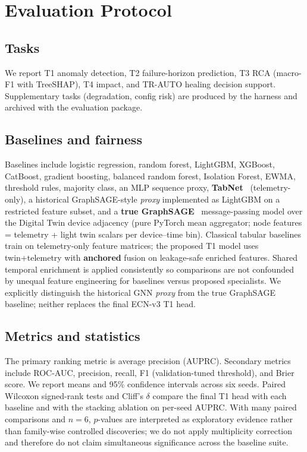 \section{Evaluation Protocol}
\label{sec:eval}

\subsection{Tasks}
We report T1 anomaly detection, T2 failure-horizon prediction, T3 RCA (macro-F1 with TreeSHAP), T4 impact, and TR-AUTO healing decision support. Supplementary tasks (degradation, config risk) are produced by the harness and archived with the evaluation package.

\subsection{Baselines and fairness}
Baselines include logistic regression, random forest, LightGBM, XGBoost, CatBoost, gradient boosting, balanced random forest, Isolation Forest, EWMA, threshold rules, majority class, an MLP sequence proxy, \textbf{TabNet}~\cite{arik2021tabnet} (telemetry-only), a historical GraphSAGE-style \emph{proxy} implemented as LightGBM on a restricted feature subset, and a \textbf{true GraphSAGE}~\cite{hamilton2017inductive} message-passing model over the Digital Twin device adjacency (pure PyTorch mean aggregator; node features = telemetry + light twin scalars per device--time bin). Classical tabular baselines train on telemetry-only feature matrices; the proposed T1 model uses twin+telemetry with \textbf{anchored} fusion on leakage-safe enriched features. Shared temporal enrichment is applied consistently so comparisons are not confounded by unequal feature engineering for baselines versus proposed specialists. We explicitly distinguish the historical GNN \emph{proxy} from the true GraphSAGE baseline; neither replaces the final ECN-v3 T1 head.

\subsection{Metrics and statistics}
The primary ranking metric is average precision (AUPRC). Secondary metrics include ROC-AUC, precision, recall, F1 (validation-tuned threshold), and Brier score. We report means and 95\% confidence intervals across six seeds. Paired Wilcoxon signed-rank tests and Cliff's $\delta$ compare the final T1 head with each baseline and with the stacking ablation on per-seed AUPRC. With many paired comparisons and $n{=}6$, $p$-values are interpreted as exploratory evidence rather than family-wise controlled discoveries; we do not apply multiplicity correction and therefore do not claim simultaneous significance across the baseline suite.

